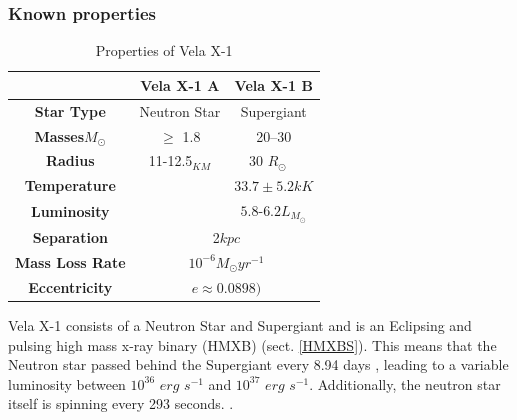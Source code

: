\documentclass[12pt, a4paper]{article}
\begin{document}
    \begin{table} [H]
            \subsubsection{Known properties}
            \begin{center}
                \begin{tabular}{||c || c | c||} 
                 \hline
                 & Vela X-1 A & Vela X-1 B  \\ 
                 \hline\hline
                 \textbf{Star Type} & Neutron Star & Supergiant \cite{Kretschmar_2021} \\ 
                 \hline
                 \textbf{Masses}\(M_\odot\) & $\ge$ 1.8 \cite{Kretschmar_2021} & 20–30 \cite{Kretschmar_2021} \\
                 \hline
                 \textbf{Radius} & 11-12.5$_{KM}$ \cite{Kretschmar_2021} & 30 \(R_\odot\)
                ~\cite{Kretschmar_2021} \\
                 \hline 
                 \textbf{Temperature} &  & $33.7 \pm 5.2 kK$ \cite{Kretschmar_2021}\\ 
                 \hline
                 \textbf{Luminosity} & & $5.8$-$6.2 L_{M_\odot}$ \cite{Kretschmar_2021} \\
                 \hline
                 \textbf{Separation} & \multicolumn{2}{c||}{2$kpc$ \cite{Kretschmar_2021}} \\
                 \hline 
                 \textbf{Mass Loss Rate} & \multicolumn{2}{c||}{$10^{-6} M_\odot yr^{-1}$ \cite{Kretschmar_2021}} \\
                 \hline
                 \textbf{Eccentricity} & \multicolumn{2}{c||}{$ e \approx  0.0898)$ \cite{Kretschmar_2021}} \\
                 \hline
                \end{tabular}
                \caption{Properties of Vela X-1} 
                \label{VelaX1} 

            \end{center}
    \end{table}

        Vela X-1 consists of a Neutron Star and Supergiant and is an Eclipsing and pulsing high mass x-ray binary (HMXB)  (sect. \ref{HMXBS}). This means that the Neutron star passed behind the Supergiant every 8.94 days \cite{Falanga_2015}, leading to a variable luminosity between $10^{36}$ $erg$ $s^{-1}$ and $10^{37}$ $erg$ $s^{-1}$. Additionally, the neutron star itself is spinning every 293 seconds. \cite{Kretschmar_2021}. 
        
\end{document}
